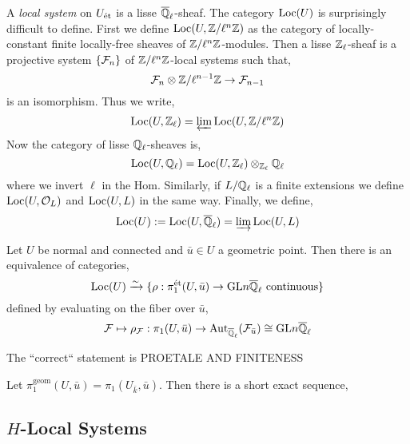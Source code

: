 \documentclass[12pt]{article}
\begin{document}
\begin{defn}
A \textit{local system} on $U_{\text{\'{e}t}}$ is a lisse $\overline{\mathbb{Q}}_{\ell}$-sheaf. The category $\mathrm{Loc}(U)$ is surprisingly difficult to define. First we define $\mathrm{Loc}(U, \mathbb{Z}/\ell^n\mathbb{Z})$ as the category of locally-constant finite locally-free \etale sheaves of $\mathbb{Z} / \ell^n\mathbb{Z}$-modules. Then a lisse $\mathbb{Z}_\ell$-sheaf is a projective system $\{ \mathcal{F}_n \}$ of $\mathbb{Z} / \ell^n \mathbb{Z}$-local systems such that,
\[ \mathcal{F}_n \otimes \mathbb{Z} / \ell^{n-1} \mathbb{Z} \to \mathcal{F}_{n-1} \]
is an isomorphism. Thus we write,
\[ \mathrm{Loc}(U, \mathbb{Z}_\ell) = \varprojlim \mathrm{Loc}(U, \mathbb{Z} / \ell^n \mathbb{Z}) \]
Now the category of lisse $\mathbb{Q}_\ell$-sheaves is,
\[ \mathrm{Loc}(U, \mathbb{Q}_\ell) = \mathrm{Loc}(U, \mathbb{Z}_\ell) \otimes_{\mathbb{Z}_\ell} \mathbb{Q}_\ell \]
where we invert $\ell$ in the Hom. Similarly, if $L / \mathbb{Q}_\ell$ is a finite extensions we define $\mathrm{Loc}(U, \mathcal{O}_{L})$ and $\mathrm{Loc}(U, L)$ in the same way. Finally, we define,
\[ \mathrm{Loc}(U) := \mathrm{Loc}(U, \overline{\mathbb{Q}}_\ell) = \varinjlim \mathrm{Loc}(U, L) \]
\end{defn}

\begin{thm}
Let $U$ be normal and connected and $\bar{u} \in U$ a geometric point. Then there is an equivalence of categories,
\[ \mathrm{Loc}(U) \xrightarrow{\sim} \{ \rho : \pi_1^{\text{\'{e}t}}(U, \bar{u}) \to \mathrm{GL}{n}{\overline{\mathbb{Q}}_\ell} \text{ continuous} \} \]
defined by evaluating on the fiber over $\bar{u}$,
\[ \mathcal{F} \mapsto \rho_{\mathcal{F}} : \pi_1(U, \bar{u}) \to \mathrm{Aut}_{\overline{\mathbb{Q}}_\ell}(\mathcal{F}_{\bar{u}}) \cong \mathrm{GL}{n}{\overline{\mathbb{Q}}_\ell} \]
\end{thm}

\begin{rmk}
The ``correct`` statement is PROETALE AND FINITENESS
\end{rmk}

\newcommand{\geom}{\mathrm{geom}}

\begin{rmk}
Let $\pi_1^{\geom}(U, \bar{u}) = \pi_1(U_{\bar{k}}, \bar{u})$. Then there is a short exact sequence,
\begin{center}
\end{center}
\end{rmk}

\subsection{$H$-Local Systems}
\end{document}
